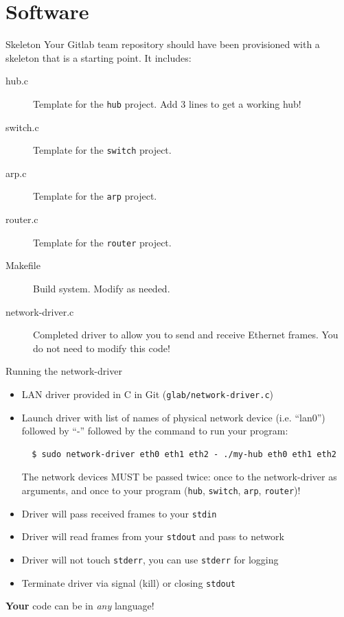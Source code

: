 \documentclass{beamer}
\begin{document}
\section{Software}

\begin{frame}{Skeleton}
Your Gitlab team repository should have been provisioned with a skeleton
that is a starting point. It includes:
\begin{description}
\item[hub.c] Template for the {\tt hub} project. Add 3 lines to get a working hub!
\item[switch.c] Template for the {\tt switch} project.
\item[arp.c] Template for the {\tt arp} project.
\item[router.c] Template for the {\tt router} project.
\item[Makefile] Build system.  Modify as needed.
\item[network-driver.c] Completed driver to allow you to send and receive
   Ethernet frames. You do not need to modify this code!
\end{description}
\end{frame}


\begin{frame}[fragile]{Running the network-driver}
\begin{itemize}
\item LAN driver provided in C in Git ({\tt glab/network-driver.c})
\item Launch driver with list of names of physical network device (i.e. ``lan0'')
      followed by ``-'' followed by the command to run your program:
\begin{verbatim}
  $ sudo network-driver eth0 eth1 eth2 - ./my-hub eth0 eth1 eth2
\end{verbatim}
  The network devices MUST be passed twice: once to the network-driver
  as arguments, and once to your program ({\tt hub}, {\tt switch}, {\tt arp}, {\tt router})!
\item Driver will pass received frames to your {\tt stdin}
\item Driver will read frames from your {\tt stdout} and pass to network
\item Driver will not touch {\tt stderr}, you can use {\tt stderr} for logging
\item Terminate driver via signal (kill) or closing {\tt stdout}
\end{itemize}
\begin{center}
{\bf Your} code can be in {\em any} language!
\end{center}
\end{frame}
\end{document}
